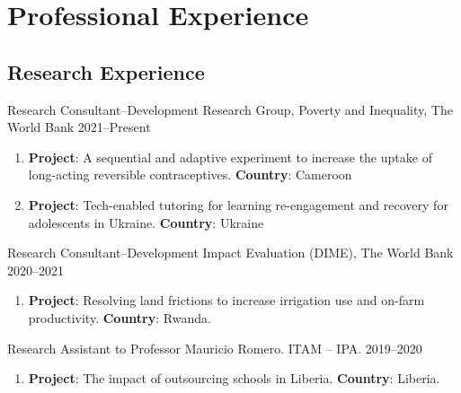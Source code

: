 \documentclass[a4paper, 10pt]{article}
\renewenvironment{itemize}{
  \begin{list}{}
    { \setlength{\itemsep}{5pt}
      \setlength{\parsep}{0pt}
      \setlength{\topsep}{0pt}
      \setlength{\leftmargin}{0em} } }{
  \end{list}}
\begin{document}

\section*{Professional Experience}

\subsection*{Research Experience}

\begin{itemize}
  \item Research Consultant--Development Research Group, Poverty and Inequality, The World Bank \hfill 2021--Present 
  \begin{enumerate}[leftmargin=10pt, label={}, nosep]
    \item {\small \textbf{Project}: A sequential and adaptive experiment to increase the uptake of long-acting reversible contraceptives. \newline 
    \textbf{Country}: Cameroon} 
    \item {\small \textbf{Project}: Tech-enabled tutoring for learning re-engagement and recovery for adolescents in Ukraine. \newline 
    \textbf{Country}: Ukraine}
  \end{enumerate}
  \item Research Consultant--Development Impact Evaluation (DIME), The World Bank \hfill 2020--2021 
  \begin{enumerate}[leftmargin=10pt, label={}, nosep]  
    \item {\small \textbf{Project}: Resolving land frictions to increase irrigation use and on-farm productivity. \newline \textbf{Country}: Rwanda.}
  \end{enumerate}
  \item Research Assistant to Professor Mauricio Romero. ITAM -- IPA. \hfill 2019--2020  
  \begin{enumerate}[leftmargin=10pt, label={}, nosep]  
    \item {\small \textbf{Project}: The impact of outsourcing schools in Liberia. \newline \textbf{Country}: Liberia.}
  \end{enumerate}

\end{itemize}
\end{document}
